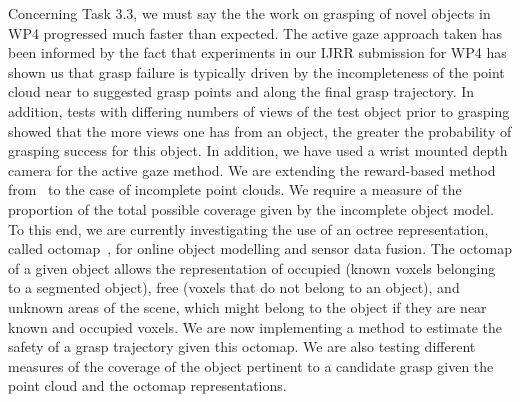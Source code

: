 \documentclass[a4paper,11pt,pdf]{pacmanreport}
\begin{document}
Concerning Task 3.3, we must say the the work on grasping of novel objects in WP4 progressed much faster than expected. 
The active gaze approach taken has been informed by the fact that experiments in our IJRR submission for WP4 has shown us that grasp failure is typically driven by the incompleteness of the point cloud near to suggested grasp points and along the final grasp trajectory. In addition, tests with differing numbers of views of the test object prior to grasping showed that the more views one has from an object, the greater the probability of grasping success for this object. In addition, we have used a wrist mounted depth camera for the active gaze method. We are extending the reward-based method from~\cite{nunez2013models} to the case of incomplete point clouds. We require a measure of the proportion of the total possible coverage given by the incomplete object model. To this end, we are currently investigating the use of an octree representation, called octomap~\cite{hornung13auro}, for online object modelling and sensor data fusion. The octomap of a given object allows the representation of occupied (known voxels belonging to a segmented object), free (voxels that do not belong to an object), and unknown areas of the scene, which might belong to the object if they are near known and occupied voxels. We are now implementing a method to estimate the safety of a grasp trajectory given this octomap. We are also testing different measures of the coverage of the object pertinent to a candidate grasp given the point cloud and the octomap representations.

\end{document}
